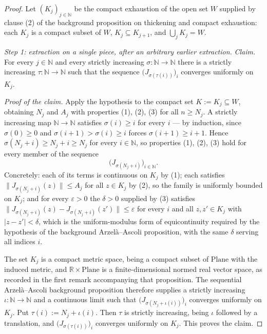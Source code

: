 \begin{proof}
Let $(K_j)_{j\in\mathbb{N}}$ be the compact exhaustion of the open set $W$ supplied by clause
(2) of the background proposition on thickening and compact exhaustion: each $K_j$ is a compact
subset of $W$, $K_j\subseteq K_{j+1}$, and $\bigcup_jK_j=W$.

\medskip\noindent\emph{Step 1: extraction on a single piece, after an arbitrary earlier
extraction.}
\emph{Claim.}  For every $j\in\mathbb{N}$ and every strictly increasing
$\sigma\colon\mathbb{N}\to\mathbb{N}$ there is a strictly increasing
$\tau\colon\mathbb{N}\to\mathbb{N}$ such that the sequence $\bigl(J_{\sigma(\tau(i))}\bigr)_i$
converges uniformly on $K_j$.

\emph{Proof of the claim.}  Apply the hypothesis to the compact set $K:=K_j\subseteq W$,
obtaining $N_j$ and $A_j$ with properties (1), (2), (3) for all $n\ge N_j$.  A strictly
increasing map $\mathbb{N}\to\mathbb{N}$ satisfies $\sigma(i)\ge i$ for every $i$ --- by
induction, since $\sigma(0)\ge0$ and $\sigma(i+1)>\sigma(i)\ge i$ forces $\sigma(i+1)\ge i+1$.
Hence $\sigma(N_j+i)\ge N_j+i\ge N_j$ for every $i\in\mathbb{N}$, so properties (1), (2), (3)
hold for every member of the sequence
\[
  \bigl(J_{\sigma(N_j+i)}\bigr)_{i\in\mathbb{N}} .
\]
Concretely: each of its terms is continuous on $K_j$ by (1); each satisfies
$\lVert J_{\sigma(N_j+i)}(z)\rVert\le A_j$ for all $z\in K_j$ by (2), so the family is uniformly
bounded on $K_j$; and for every $\varepsilon>0$ the $\delta>0$ supplied by (3) satisfies
$\lVert J_{\sigma(N_j+i)}(z)-J_{\sigma(N_j+i)}(z')\rVert\le\varepsilon$ for every $i$ and all
$z,z'\in K_j$ with $\lvert z-z'\rvert<\delta$, which is the uniform-modulus form of
equicontinuity required by the hypothesis of the background Arzel\`a--Ascoli proposition, with
the same $\delta$ serving all indices $i$.

The set $K_j$ is a compact metric space, being a compact subset of $\mathrm{Plane}$ with the
induced metric, and $\mathbb{R}\times\mathrm{Plane}$ is a finite-dimensional normed real vector
space, as recorded in the first remark accompanying that proposition.  The sequential
Arzel\`a--Ascoli background proposition therefore supplies a strictly increasing
$\iota\colon\mathbb{N}\to\mathbb{N}$ and a continuous limit such that
$\bigl(J_{\sigma(N_j+\iota(i))}\bigr)_i$ converges uniformly on $K_j$.  Put
$\tau(i):=N_j+\iota(i)$.  Then $\tau$ is strictly increasing, being $\iota$ followed by a
translation, and $\bigl(J_{\sigma(\tau(i))}\bigr)_i$ converges uniformly on $K_j$.  This proves
the claim.


\end{proof}
